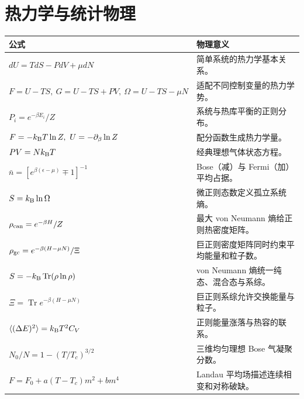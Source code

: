 \section{热力学与统计物理}
\begin{longtable}{p{}p{}}\toprule
公式&物理意义\\\midrule\endhead
$dU=TdS-PdV+\mu dN$&简单系统的热力学基本关系。\\
$F=U-TS,\ G=U-TS+PV,\ \Omega=U-TS-\mu N$&适配不同控制变量的热力学势。\\
$P_i=e^{-\beta E_i}/Z$&系统与热库平衡的正则分布。\\
$F=-\kb T\ln Z,\ U=-\partial_\beta\ln Z$&配分函数生成热力学量。\\
$PV=Nk_{\mathrm B} T$&经典理想气体状态方程。\\
$\bar n=[e^{\beta(\epsilon-\mu)}\mp1]^{-1}$&Bose（减）与 Fermi（加）平均占据。\\
$S=k_{\mathrm B}\ln\Omega$&微正则态数定义孤立系统熵。\\
$\rho_{\rm can}=e^{-\beta H}/Z$&最大 von Neumann 熵给正则热密度矩阵。\\
$\rho_{\rm gc}=e^{-\beta(H-\mu N)}/\Xi$&巨正则密度矩阵同时约束平均能量和粒子数。\\
$S=-k_{\mathrm B}\operatorname{Tr}(\rho\ln\rho)$&von Neumann 熵统一纯态、混合态与系综。\\
$\Xi=\operatorname{Tr}e^{-\beta(H-\mu N)}$&巨正则系综允许交换能量与粒子。\\
$\langle(\Delta E)^2\rangle=k_{\mathrm B} T^2C_V$&正则能量涨落与热容的联系。\\
$N_0/N=1-(T/T_c)^{3/2}$&三维均匀理想 Bose 气凝聚分数。\\
$F=F_0+a(T-T_c)m^2+bm^4$&Landau 平均场描述连续相变和对称破缺。\\\bottomrule
\end{longtable}

